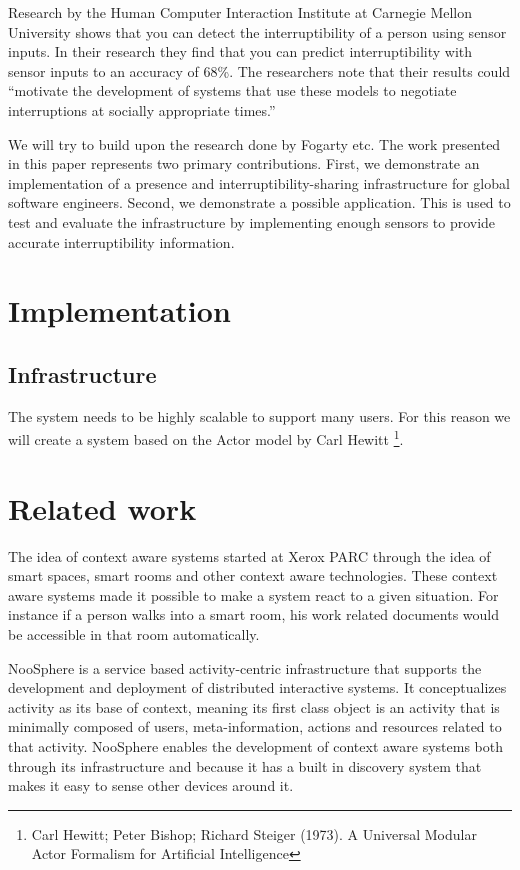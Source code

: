 \documentclass{sigchi}
\begin{document}
Research by the Human Computer Interaction Institute at Carnegie Mellon University \cite{Fogarty:2005:PHI:1057237.1057243} shows that you can detect the interruptibility of a person using sensor inputs.
In their research they find that you can predict interruptibility with sensor inputs to an accuracy of 68\%.
The researchers note that their results could ``motivate the development of systems that use these models to negotiate interruptions at socially appropriate times.''

We will try to build upon the research done by Fogarty etc.
The work presented in this paper represents two primary contributions.
First, we demonstrate an implementation of a presence and interruptibility-sharing infrastructure for global software engineers.
Second, we demonstrate a possible application. This is used to test and evaluate the infrastructure by implementing enough sensors to provide accurate interruptibility information.

\section{Implementation}
\subsection{Infrastructure}
The system needs to be highly scalable to support many users.
For this reason we will create a system based on the Actor model by Carl Hewitt \footnote{Carl Hewitt; Peter Bishop; Richard Steiger (1973). A Universal Modular Actor Formalism for Artificial Intelligence}.

\section{Related work}
The idea of context aware systems started at Xerox PARC through the idea of smart spaces, smart rooms and other context aware technologies.
These context aware systems made it possible to make a system react to a given situation.
For instance if a person walks into a smart room, his work related documents would be accessible in that room automatically.

NooSphere \cite{houben2013noosphere} is a service based activity-centric infrastructure that supports the development and deployment of distributed interactive systems.
It conceptualizes activity as its base of context, meaning its first class object is an activity that is minimally composed of users, meta-information, actions and resources related to that activity.
NooSphere enables the development of context aware systems both through its infrastructure and because it has a built in discovery system that makes it easy to sense other devices around it.
\end{document}
